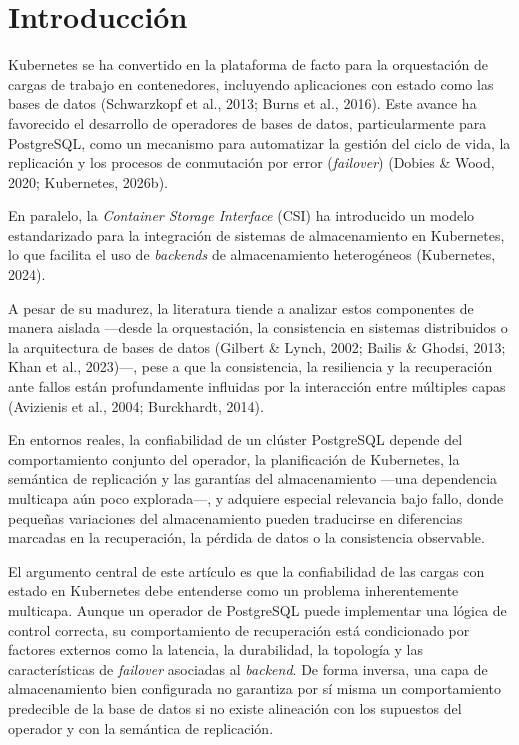\documentclass[12pt,twocolumn,letterpaper]{article}
\begin{document}
\justifying

\section{Introducción}
Kubernetes se ha convertido en la plataforma de facto para la orquestación de cargas de trabajo en contenedores, incluyendo aplicaciones con estado como las bases de datos (Schwarzkopf et al., 2013; Burns et al., 2016). Este avance ha favorecido el desarrollo de operadores de bases de datos, particularmente para PostgreSQL, como un mecanismo para automatizar la gestión del ciclo de vida, la replicación y los procesos de conmutación por error (\textit{failover}) (Dobies \& Wood, 2020; Kubernetes, 2026b).

En paralelo, la \textit{Container Storage Interface} (CSI) ha introducido un modelo estandarizado para la integración de sistemas de almacenamiento en Kubernetes, lo que facilita el uso de \textit{backends} de almacenamiento heterogéneos (Kubernetes, 2024).

A pesar de su madurez, la literatura tiende a analizar estos componentes de manera aislada —desde la orquestación, la consistencia en sistemas distribuidos o la arquitectura de bases de datos (Gilbert \& Lynch, 2002; Bailis \& Ghodsi, 2013; Khan et al., 2023)—, pese a que la consistencia, la resiliencia y la recuperación ante fallos están profundamente influidas por la interacción entre múltiples capas (Avizienis et al., 2004; Burckhardt, 2014).

En entornos reales, la confiabilidad de un clúster PostgreSQL depende del comportamiento conjunto del operador, la planificación de Kubernetes, la semántica de replicación y las garantías del almacenamiento —una dependencia multicapa aún poco explorada—, y adquiere especial relevancia bajo fallo, donde pequeñas variaciones del almacenamiento pueden traducirse en diferencias marcadas en la recuperación, la pérdida de datos o la consistencia observable.

El argumento central de este artículo es que la confiabilidad de las cargas con estado en Kubernetes debe entenderse como un problema inherentemente multicapa. Aunque un operador de PostgreSQL puede implementar una lógica de control correcta, su comportamiento de recuperación está condicionado por factores externos como la latencia, la durabilidad, la topología y las características de \textit{failover} asociadas al \textit{backend}. De forma inversa, una capa de almacenamiento bien configurada no garantiza por sí misma un comportamiento predecible de la base de datos si no existe alineación con los supuestos del operador y con la semántica de replicación.
\end{document}
